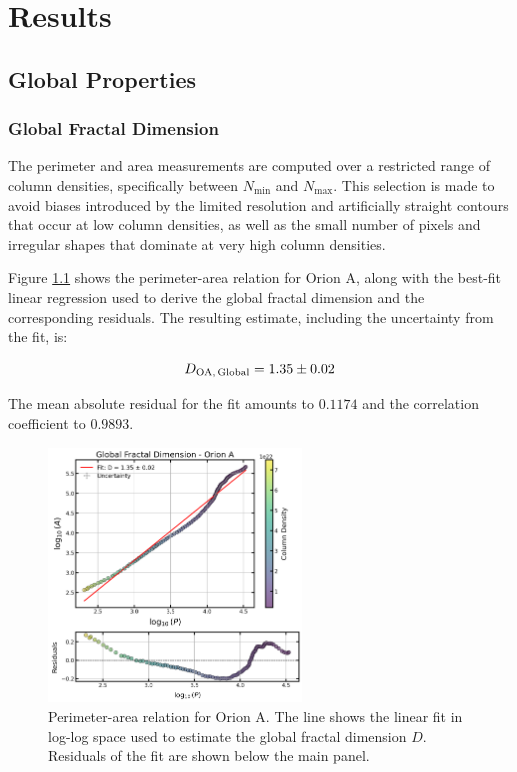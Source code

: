 \chapter{Results}
\label{ch:results}

\section{Global Properties}

\subsection{Global Fractal Dimension}

The perimeter and area measurements are computed over a restricted range of column densities, specifically between $N_\mathrm{min}$ and $N_\mathrm{max}$. This selection is made to avoid biases introduced by the limited resolution and artificially straight contours that occur at low column densities, as well as the small number of pixels and irregular shapes that dominate at very high column densities.

Figure \ref{fig:orion_A_global} shows the perimeter-area relation for Orion A, along with the best-fit linear regression used to derive the global fractal dimension and the corresponding residuals. The resulting estimate, including the uncertainty from the fit, is:

\begin{equation}
    \notag
    D_{\mathrm{OA,\,Global}} = 1.35 \pm 0.02
\end{equation}

The mean absolute residual for the fit amounts to $0.1174$ and the correlation coefficient to $0.9893$.

\begin{figure}[t]
    \centering
    \includegraphics[width=0.6\textwidth]{figures/orion_A_global.png}
    \caption{Perimeter-area relation for Orion A. The line shows the linear fit in log-log space used to estimate the global fractal dimension $D$. Residuals of the fit are shown below the main panel.}
    \label{fig:orion_A_global}
\end{figure}

